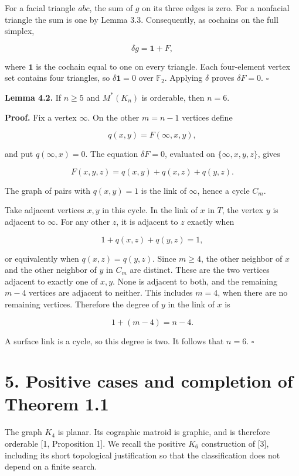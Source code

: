\documentclass[11pt]{article}
\begin{document}
For a facial triangle $abc$, the sum of $g$ on its three edges is zero. For a nonfacial triangle the sum is one by Lemma 3.3. Consequently, as cochains on the full simplex,

\[
\delta g=\mathbf 1+F,
\]

where $\mathbf 1$ is the cochain equal to one on every triangle. Each four-element vertex set contains four triangles, so $\delta\mathbf 1=0$ over $\mathbb F_2$. Applying $\delta$ proves $\delta F=0$. $\square$

\textbf{Lemma 4.2.} If $n\ge5$ and $M^*(K_n)$ is orderable, then $n=6$.

\textbf{Proof.} Fix a vertex $\infty$. On the other $m=n-1$ vertices define

\[
q(x,y)=F(\infty,x,y),
\]

and put $q(\infty,x)=0$. The equation $\delta F=0$, evaluated on $\{\infty,x,y,z\}$, gives

\[
F(x,y,z)=q(x,y)+q(x,z)+q(y,z).
\]

The graph of pairs with $q(x,y)=1$ is the link of $\infty$, hence a cycle $C_m$.

Take adjacent vertices $x,y$ in this cycle. In the link of $x$ in $T$, the vertex $y$ is adjacent to $\infty$. For any other $z$, it is adjacent to $z$ exactly when

\[
1+q(x,z)+q(y,z)=1,
\]

or equivalently when $q(x,z)=q(y,z)$. Since $m\ge4$, the other neighbor of $x$ and the other neighbor of $y$ in $C_m$ are distinct. These are the two vertices adjacent to exactly one of $x,y$. None is adjacent to both, and the remaining $m-4$ vertices are adjacent to neither. This includes $m=4$, when there are no remaining vertices. Therefore the degree of $y$ in the link of $x$ is

\[
1+(m-4)=n-4.
\]

A surface link is a cycle, so this degree is two. It follows that $n=6$. $\square$

\section*{5. Positive cases and completion of Theorem 1.1}

The graph $K_4$ is planar. Its cographic matroid is graphic, and is therefore orderable [1, Proposition 1]. We recall the positive $K_6$ construction of [3], including its short topological justification so that the classification does not depend on a finite search.
\end{document}
